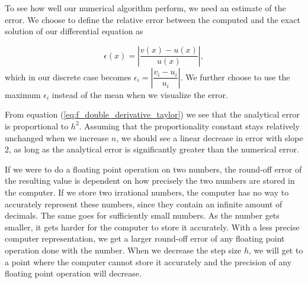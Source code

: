 \documentclass{emulateapj}
\begin{document}
        To see how well our numerical algorithm perform, we need an estimate of the error. We choose to define the relative error between the computed and the exact solution of our differential equation as \cite[Chapter 2]{compfys}
        
        \begin{equation}\label{eq:max_rel_error}
            \epsilon(x) = \left| \dfrac{v(x) - u(x)}{u(x)}\right|,
        \end{equation}
        which in our discrete case becomes \(\epsilon_{i} = \left| \dfrac{v_{i} - u_{i}}{u_{i}}\right|\). We further choose to use the maximum \(\epsilon_{i}\) instead of the mean when we visualize the error.
        
        From equation (\ref{eq:f_double_derivative_taylor}) we see that the analytical error is proportional to \(h^{2}\). Assuming that the proportionality constant stays relatively unchanged when we increase \(n\), we should see a linear decrease in error with slope 2, as long as the analytical error is significantly greater than the numerical error.
        \newline

        If we were to do a floating point operation on two numbers, the round-off error of the resulting value is dependent on how precisely the two numbers are stored in the computer. If we store two irrational numbers, the computer has no way to accurately represent these numbers, since they contain an infinite amount of decimals. The same goes for sufficiently small numbers. As the number gets smaller, it gets harder for the computer to store it accurately. With a less precise computer representation, we get a larger round-off error of any floating point operation done with the number. When we decrease the step size \(h\), we will get to a point where the computer cannot store it accurately and the precision of any floating point operation will decrease.
     
\end{document}
